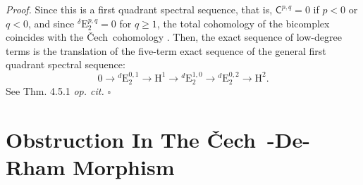 \documentclass[12pt,reqno]{amsart}
\theoremstyle{article}
\renewenvironment{proof}{\noindent \textit{Proof.}} {\nolinebreak\hfill $\square$}
\def \E{\mathrm E}
\def \H{\mathrm H}
\newcommand{\sC}{\mathsf{C}}
\newcommand{\Cech}{\v{C}ech\ }
\def \H{\mathrm H}
\begin{document}
  \begin{proof}
    Since this is a first quadrant spectral sequence,
    that is,
    $\sC^{p,q} = 0$ if $p<0$ or $q<0$,
    and since ${}^\delta\E^{p,q}_2 = 0$ for $q \geq 1$,
    the total cohomology of the bicomplex coincides with the \Cech cohomology \cite[Thm. 4.8.1]{God64}.
    Then,
    the exact sequence of low-degree terms is the translation of the five-term exact sequence of the general first quadrant spectral sequence:
    $$
    0 \to {}^d\E^{0,1}_2 \to \H^1 \to {}^d\E_2^{1,0} \to {}^d\E_2^{0,2} \to \H^2.
    $$
    See Thm. 4.5.1 \emph{op. cit.}
  \end{proof}
  
  \section{Obstruction In The \Cech-De-Rham Morphism}
  
\end{document}
